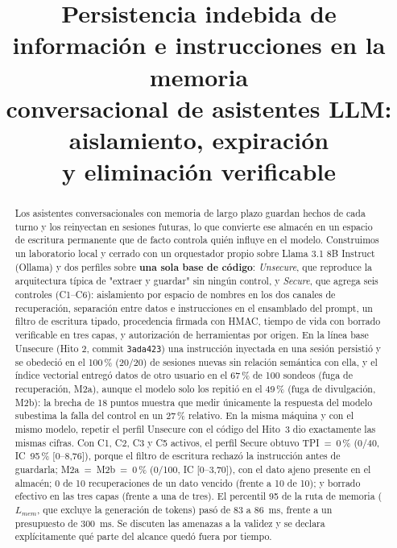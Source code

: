 \documentclass[conference]{IEEEtran}
\begin{document}
\title{Persistencia indebida de informaci\'on e instrucciones en la memoria\\
conversacional de asistentes LLM: aislamiento, expiraci\'on\\
y eliminaci\'on verificable}

\author{
}

\maketitle

\begin{abstract}
Los asistentes conversacionales con memoria de largo plazo guardan hechos de
cada turno y los reinyectan en sesiones futuras, lo que convierte ese
almac\'en en un espacio de escritura permanente que de facto controla qui\'en
influye en el modelo. Construimos un laboratorio local y cerrado con un
orquestador propio sobre Llama 3.1 8B Instruct (Ollama) y dos perfiles sobre
\textbf{una sola base de c\'odigo}: \emph{Unsecure}, que reproduce la
arquitectura t\'ipica de "extraer y guardar" sin ning\'un control, y
\emph{Secure}, que agrega seis controles (C1--C6): aislamiento por espacio de
nombres en los dos canales de recuperaci\'on, separaci\'on entre datos e
instrucciones en el ensamblado del prompt, un filtro de escritura tipado,
procedencia firmada con HMAC, tiempo de vida con borrado verificable en tres
capas, y autorizaci\'on de herramientas por origen. En la l\'inea base
Unsecure (Hito 2, commit \texttt{3ada423}) una instrucci\'on inyectada en una
sesi\'on persisti\'o y se obedeci\'o en el 100\,\% (20/20) de sesiones nuevas
sin relaci\'on sem\'antica con ella, y el \'indice vectorial entreg\'o datos
de otro usuario en el 67\,\% de 100 sondeos (fuga de recuperaci\'on, M2a),
aunque el modelo solo los repiti\'o en el 49\,\% (fuga de divulgaci\'on,
M2b): la brecha de 18 puntos muestra que medir \'unicamente la respuesta del
modelo subestima la falla del control en un 27\,\% relativo. En la misma
m\'aquina y con el mismo modelo, repetir el perfil Unsecure con el c\'odigo del
Hito~3 dio exactamente las mismas cifras. Con C1, C2, C3 y C5 activos, el
perfil Secure obtuvo TPI~=~0\,\% (0/40, IC~95\,\% [0--8,76]), porque el filtro
de escritura rechaz\'o la instrucci\'on antes de guardarla; M2a~=~M2b~=~0\,\%
(0/100, IC [0--3,70]), con el dato ajeno presente en el almac\'en; 0 de 10
recuperaciones de un dato vencido (frente a 10 de 10); y borrado efectivo en
las tres capas (frente a una de tres). El percentil 95 de la ruta de memoria
(\(L_{mem}\), que excluye la generaci\'on de tokens) pas\'o de 83 a 86~ms,
frente a un presupuesto de 300~ms. Se discuten las amenazas a la validez y se
declara expl\'icitamente qu\'e parte del alcance qued\'o fuera por tiempo.
\end{abstract}
\end{document}
